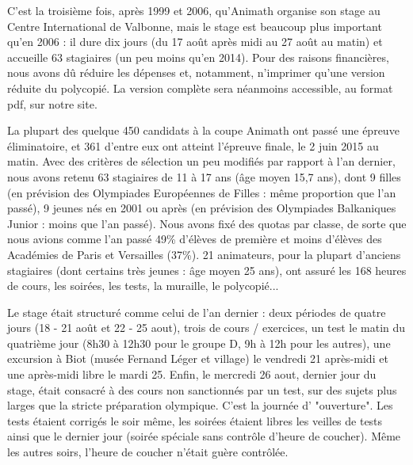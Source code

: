 
C'est la troisième fois, après 1999 et 2006, qu'Animath organise son stage au Centre International de Valbonne, mais le stage est beaucoup plus important qu'en 2006 : il dure dix jours (du 17 août après midi au 27 août au matin) et accueille 63 stagiaires (un peu moins qu'en 2014). Pour des raisons financières, nous avons dû réduire les dépenses et, notamment, n'imprimer qu'une version réduite du polycopié. La version complète sera néanmoins accessible, au format pdf, sur notre site. 

La plupart des quelque 450 candidats à la coupe Animath ont passé une épreuve éliminatoire, et 361 d'entre eux ont atteint l'épreuve finale, le 2 juin 2015 au matin. Avec des critères de sélection un peu modifiés par rapport à l'an dernier, nous avons retenu 63 stagiaires de 11 à 17 ans (âge moyen 15,7 ans), dont 9 filles (en prévision des Olympiades Européennes de Filles : même proportion que l'an passé), 9 jeunes nés en 2001 ou après (en prévision des Olympiades Balkaniques Junior : moins que l'an passé). Nous avons fixé des quotas par classe, de sorte que nous avions comme l'an passé 49\% d'élèves de première et moins d'élèves des Académies de Paris et Versailles (37\%). 21 animateurs, pour la plupart d'anciens stagiaires (dont certains très jeunes : âge moyen 25 ans), ont assuré les 168 heures de cours, les soirées, les tests, la muraille, le polycopié...

Le stage était structuré comme celui de l'an dernier : deux périodes de quatre jours (18 - 21 août et 22 - 25 aout), trois de cours / exercices, un test le matin du quatrième jour (8h30 à 12h30 pour le groupe D, 9h à 12h pour les autres), une excursion à Biot (musée Fernand Léger et village) le vendredi 21 après-midi et une après-midi libre le mardi 25. Enfin, le mercredi 26 aout, dernier jour du stage, était consacré à des cours non sanctionnés par un test, sur des sujets plus larges que la stricte préparation olympique. C'est la journée d' "ouverture". Les tests étaient corrigés le soir même, les soirées étaient libres les veilles de tests ainsi que le dernier jour (soirée spéciale sans contrôle d'heure de coucher). Même les autres soirs, l'heure de coucher n'était guère contrôlée. 

